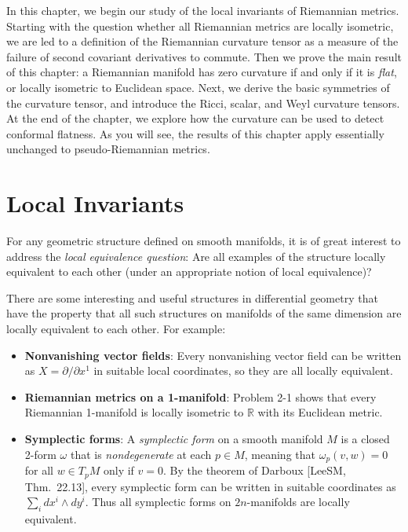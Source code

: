 
In this chapter, we begin our study of the local invariants of Riemannian metrics. Starting with the question whether all Riemannian metrics are locally isometric, we are led to a definition of the Riemannian curvature tensor as a measure of the failure of second covariant derivatives to commute. Then we prove the main result of this chapter: a Riemannian manifold has zero curvature if and only if it is \emph{flat}, or locally isometric to Euclidean space. Next, we derive the basic symmetries of the curvature tensor, and introduce the Ricci, scalar, and Weyl curvature tensors. At the end of the chapter, we explore how the curvature can be used to detect conformal flatness. As you will see, the results of this chapter apply essentially unchanged to pseudo-Riemannian metrics.

\section{Local Invariants}

For any geometric structure defined on smooth manifolds, it is of great interest to address the \emph{local equivalence question}: Are all examples of the structure locally equivalent to each other (under an appropriate notion of local equivalence)?

There are some interesting and useful structures in differential geometry that have the property that all such structures on manifolds of the same dimension are locally equivalent to each other. For example:

\begin{itemize}
\item \textbf{Nonvanishing vector fields}: Every nonvanishing vector field can be written as $X = \partial/\partial x^1$ in suitable local coordinates, so they are all locally equivalent.

\item \textbf{Riemannian metrics on a 1-manifold}: Problem 2-1 shows that every Riemannian 1-manifold is locally isometric to $\mathbb{R}$ with its Euclidean metric.

\item \textbf{Symplectic forms}: A \emph{symplectic form} on a smooth manifold $M$ is a closed 2-form $\omega$ that is \emph{nondegenerate} at each $p \in M$, meaning that $\omega_p(v,w) = 0$ for all $w \in T_pM$ only if $v = 0$. By the theorem of Darboux [LeeSM, Thm.~22.13], every symplectic form can be written in suitable coordinates as $\sum_i dx^i \wedge dy^i$. Thus all symplectic forms on $2n$-manifolds are locally equivalent.
\end{itemize}

